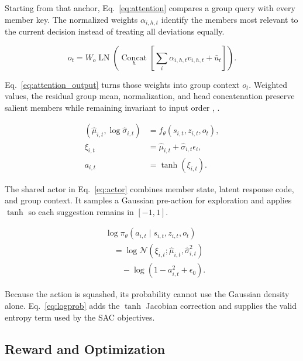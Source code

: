 \documentclass[journal]{IEEEtran}
\newcommand{\eqnote}[1]{\par\vspace{-0.3ex}\noindent #1\par\vspace{0.4ex}}
\begin{document}
\eqnote{Starting from that anchor, Eq.~\eqref{eq:attention} compares a group query with every member key. The normalized weights $\alpha_{i,h,t}$ identify the members most relevant to the current decision instead of treating all deviations equally.}

\begin{equation}
o_t=W_o\operatorname{LN}\!\left(
\operatorname*{Concat}_h\left[\sum_i\alpha_{i,h,t}v_{i,h,t}+\bar u_t\right]
\right).
\label{eq:attention_output}
\end{equation}

\eqnote{Eq.~\eqref{eq:attention_output} turns those weights into group context $o_t$. Weighted values, the residual group mean, normalization, and head concatenation preserve salient members while remaining invariant to input order \cite{ref4}, \cite{ref19}.}

\begin{equation}
\begin{aligned}
(\widehat\mu_{i,t},\log\widehat\sigma_{i,t})
&=f_\theta(s_{i,t},z_{i,t},o_t),\\
\xi_{i,t}&=\widehat\mu_{i,t}+\widehat\sigma_{i,t}\epsilon_i,\\
a_{i,t}&=\tanh(\xi_{i,t}).
\end{aligned}
\label{eq:actor}
\end{equation}

\eqnote{The shared actor in Eq.~\eqref{eq:actor} combines member state, latent response code, and group context. It samples a Gaussian pre-action for exploration and applies $\tanh$ so each suggestion remains in $[-1,1]$.}

\begin{equation}
\begin{aligned}
&\log\pi_\theta(a_{i,t}\mid s_{i,t},z_{i,t},o_t)\\
&\quad=\log\mathcal N(\xi_{i,t};\widehat\mu_{i,t},\widehat\sigma_{i,t}^2)\\
&\qquad-\log(1-a_{i,t}^2+\epsilon_0).
\end{aligned}
\label{eq:logprob}
\end{equation}

\eqnote{Because the action is squashed, its probability cannot use the Gaussian density alone. Eq.~\eqref{eq:logprob} adds the $\tanh$ Jacobian correction and supplies the valid entropy term used by the SAC objectives.}

\subsection{Reward and Optimization}
\end{document}
